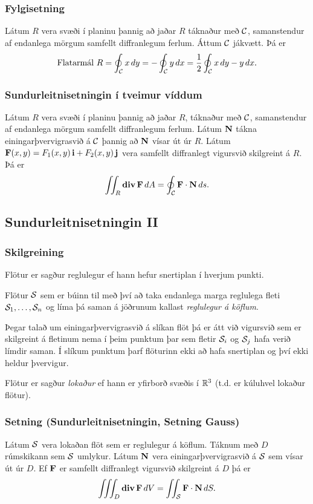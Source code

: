 \subsubsection{Fylgisetning \rtask{}}
 Látum $R$ vera svæði í planinu þannig að
jaðar $R$ táknaður með $\cal C$, 
samanstendur af endanlega mörgum samfellt diffranlegum
ferlum.  Áttum $\cal C$ jákvætt. 
Þá er 
$$\mbox{Flatarmál } R=\oint_{\cal C}x\,dy= 
-\oint_{\cal C}y\,dx=\frac{1}{2}\oint_{\cal C}x\,dy-y\,dx.$$


\subsubsection{Sundurleitnisetningin í tveimur víddum \rtask{}}

Látum $R$ vera svæði í planinu þannig að
jaðar $R$, táknaður með $\cal C$,  
samanstendur af endanlega mörgum samfellt diffranlegum
ferlum.  Látum $\mbox{${\bf N}$}$ tákna einingarþvervigrasvið á $\cal C$ þannig að
$\mbox{${\bf N}$}$ vísar út úr $R$.  Látum
$\mbox{${\bf F}$}(x,y)=F_1(x,y)\,\mbox{${\bf i}$}+F_2(x,y)\,\mbox{${\bf j}$}$ vera samfellt diffranlegt
vigursvið skilgreint á $R$.  Þá er 
$$\int\!\!\!\int_R\mbox{${\rm\bf div\,}$} \mbox{${\bf F}$}\,dA=\oint_{\cal C} \mbox{${\bf F}$}\cdot\mbox{${\bf N}$}\,ds.$$



\subsection{Sundurleitnisetningin II} 

\subsubsection{Skilgreining \rtask{}}
 Flötur er sagður reglulegur ef hann hefur snertiplan í hverjum punkti.  

Flötur $\cal S$ sem er búinn til með því að taka endanlega marga reglulega fleti ${\cal S}_1, \ldots, {\cal S}_n$ og líma þá saman á jöðrunum kallast {\em reglulegur á köflum}. 

\medskip
Þegar talað um einingarþvervigrasvið á slíkan flöt þá er átt við
vigursvið sem er skilgreint á fletinum nema í þeim punktum þar sem
fletir ${\cal S}_i$ og  ${\cal S}_j$ hafa verið límdir saman.  Í
slíkum punktum þarf flöturinn ekki að hafa snertiplan og því ekki
heldur þvervigur.

\medskip
Flötur er sagður {\em lokaður} ef hann er yfirborð svæðis í ${\mathbb R}^3$
(t.d. er kúluhvel lokaður flötur).



\subsubsection{Setning \rtask{} (Sundurleitnisetningin, Setning Gauss) }
 Látum $\cal S$ vera lokaðan flöt sem er reglulegur á köflum.  Táknum með $D$ rúmskikann sem $\cal S$ umlykur.  Látum $\mbox{${\bf N}$}$ vera einingarþvervigrasvið á $\cal S$   sem vísar út úr $D$.  Ef $\mbox{${\bf F}$}$ er samfellt diffranlegt vigursvið skilgreint á $D$ þá er 
$$\thrint_D \dive \Fv\,dV=\tvint_{\cal S} \Fv\cdot\Nv\,dS.$$



